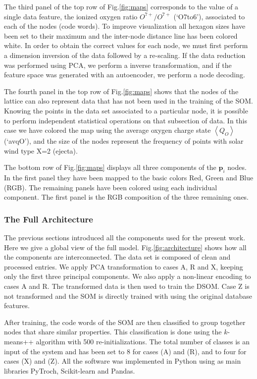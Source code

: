 The third panel of the top row of Fig.\ref{fig:maps} corresponds to the value of a single data feature, the ionized oxygen ratio $O^{7+}/O^{7+}$ (`O7to6'), associated to each of the nodes (code words). To improve visualization all hexagon sizes have been set to their maximum and the inter-node distance line has been colored white. In order to obtain the correct values for each node, we must first perform a dimension inversion of the data followed by a re-scaling. If the data reduction was performed using PCA, we perform a inverse transformation, and if the feature space was generated with an autoencoder, we perform a node decoding.

The fourth panel in the top row of Fig.\ref{fig:maps} shows that the nodes of the lattice can also represent data that has not been used in the training of the SOM. Knowing the points in the data set associated to a particular node, it is possible to perform independent statistical operations on that subsection of data. In this case we have colored the map using the average oxygen charge state $\left<Q_{O}\right>$ (`avqO'), and the size of the nodes represent the frequency of points with solar wind type X=2 (ejecta).

The bottom row of Fig.\ref{fig:maps} displays all three components of the $\boldsymbol{p}_i$ nodes. In the first panel they have been mapped to the basic colors Red, Green and Blue (RGB). The remaining panels have been colored using each individual component. The first panel is the RGB composition of the three remaining ones.

\subsubsection{The Full Architecture}
The previous sections introduced all the components used for the present work. Here we give a global view of the full model. Fig.\ref{fig:architecture} shows how all the components are interconnected. The data set is composed of clean and processed entries. We apply PCA transformation to cases A, R and X, keeping only the first three principal components. We also apply a non-linear encoding to cases A and R. The transformed data is then used to train the DSOM. Case Z is not transformed and the SOM is directly trained with using the original database features.

After training, the code words of the SOM are then classified to group together nodes that share similar properties. This classification is done using the $k$-means++ algorithm with 500 re-initializations. The total number of classes is an input of the system and has been set to 8 for cases (A) and (R), and to four for cases (X) and (Z). All the software was implemented in Python using as main libraries PyTroch, Scikit-learn and Pandas.


